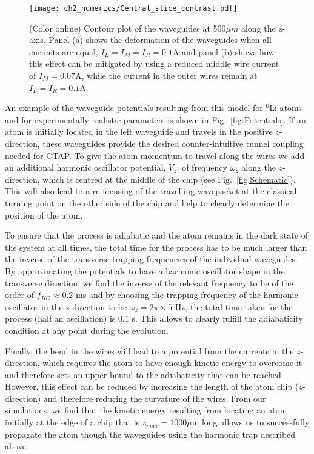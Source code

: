 \begin{figure}
  \texttt{[image: ch2\_numerics/Central\_slice\_contrast.pdf]}
  \caption{(Color online) Contour plot of the waveguides at 500$\mu m$ along the z-axis. Panel (a) shows the deformation of the waveguides when all currents are equal, $I_L=I_M=I_R=0.1$A and panel (b) shows how this effect can be mitigated by using a reduced middle wire current of $I_M=0.07$A, while the current in the outer wires remain at $I_L=I_R=0.1$A.}
  \label{fig:slice}
\end{figure}

An example of the waveguide potentials resulting from this model for $^6$Li  atoms and for experimentally realistic parameters is shown in Fig.~\ref{fig:Potentials}. If an atom is initially located in the left waveguide and travels in the positive $z$-direction, these waveguides provide the desired counter-intuitive tunnel coupling needed for CTAP. To give the atom momentum to travel along the wires we add an additional harmonic oscillator potential, $V_z$, of frequency $\omega_z$ along the $z$-direction, which is centred at the middle of the chip (see Fig.~\ref{fig:Schematic}). This will also lead to a re-focusing of the travelling wavepacket at the classical turning point on the other side of the chip and help to clearly determine the position of the atom.

To ensure that the process is adiabatic and the atom remains in the dark state of the system at all times, the total time for the process has to be much larger than the inverse of the transverse trapping frequencies of the individual waveguides. By approximating the potentials to have a harmonic oscillator shape in the transverse direction, we find the inverse of the relevant frequency to be of the order of $f_{HO} ^{-1}\approx 0.2$ ms and by choosing the trapping frequency of the harmonic oscillator in the z-direction to be $\omega_z=2 \pi \times 5$ Hz, the total time taken for the process (half an oscillation) is $0.1$ s. This allows to clearly fulfill the adiabaticity condition at any point during the evolution. 

Finally, the bend in the wires will lead to a potential from the currents in the $z$-direction, which requires the atom to have enough kinetic energy to overcome it and therefore sets an upper bound to the adiabaticity that can be reached. However, this effect can be reduced by increasing the length of the atom chip ($z$-direction) and therefore reducing the curvature of the wires. From our simulations, we find that the kinetic energy resulting from locating an atom initially at the edge of a chip that is $z_{max}=1000 \mu$m long allows us to successfully propagate the atom though the waveguides using the harmonic trap described above.

